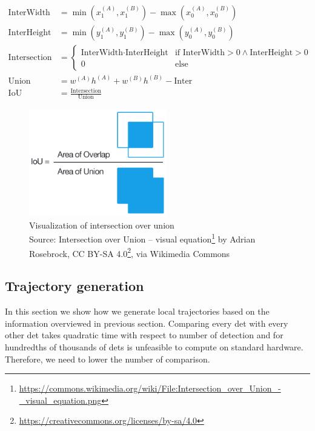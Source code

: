\begin{align*}
    \text{InterWidth} &= \min\left(x_1^{(A)}, x_1^{(B)}\right) - \max\left(x_0^{(A)}, x_0^{(B)}\right) \\
    \text{InterHeight} &= \min\left(y_1^{(A)}, y_1^{(B)}\right) - \max\left(y_0^{(A)}, y_0^{(B)}\right) \\
    \text{Intersection} &= \begin{cases}\text{InterWidth} \cdot \text{InterHeight} & \text{if InterWidth} > 0 \land \text{InterHeight} > 0 \\ 0 & \text{else}\end{cases} \\
    \text{Union} &= w^{(A)} h^{(A)} + w^{(B)} h^{(B)} - \text{Inter} \\
    \text{IoU} &= \frac{\text{Intersection}}{\text{Union}}
\end{align*}

\begin{figure}
    \centering
    \includegraphics[width=6cm]{img/Intersection_over_Union_-_visual_equation.png}
    \caption[Visualization of intersection over union]{Visualization of intersection over union\\Source: Intersection over Union -- visual equation\footnote{\url{https://commons.wikimedia.org/wiki/File:Intersection_over_Union_-_visual_equation.png}} by Adrian Rosebrock, CC BY-SA 4.0\footnote{\url{https://creativecommons.org/licenses/by-sa/4.0}}, via Wikimedia Commons}
    \label{fig:iou}
\end{figure}

\subsection{Trajectory generation}

\label{ssec:trajectory_generation}

In this section we show how we generate local trajectories based on
the information overviewed in previous section. Comparing every \gls{det} with
every other \gls{det} takes quadratic time with respect to number of detection
and for hundredths of thousands of \glspl{det} is unfeasible to compute on
standard hardware. Therefore, we need to lower the number of comparison.

